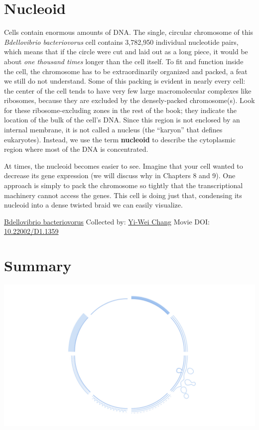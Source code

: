 \documentclass[]{tufte-book}
\begin{document}
\hypertarget{nucleoid}{%
\section{Nucleoid}\label{nucleoid}}

Cells contain enormous amounts of DNA. The single, circular chromosome of this \emph{Bdellovibrio bacteriovorus} cell contains 3,782,950 individual nucleotide pairs, which means that if the circle were cut and laid out as a long piece, it would be about \emph{one thousand times} longer than the cell itself. To fit and function inside the cell, the chromosome has to be extraordinarily organized and packed, a feat we still do not understand. Some of this packing is evident in nearly every cell: the center of the cell tends to have very few large macromolecular complexes like ribosomes, because they are excluded by the densely-packed chromosome(s). Look for these ribosome-excluding zones in the rest of the book; they indicate the location of the bulk of the cell's DNA. Since this region is not enclosed by an internal membrane, it is not called a nucleus (the ``karyon'' that defines eukaryotes). Instead, we use the term \textbf{nucleoid} to describe the cytoplasmic region where most of the DNA is concentrated.

At times, the nucleoid becomes easier to see. Imagine that your cell wanted to decrease its gene expression (we will discuss why in Chapters 8 and 9). One approach is simply to pack the chromosome so tightly that the transcriptional machinery cannot access the genes. This cell is doing just that, condensing its nucleoid into a dense twisted braid we can easily visualize.



\hypertarget{htmlwidget-012abbe380afda8eb1aa}{}

\label{fig:2-10}\protect\hyperlink{tree}{Bdellovibrio bacteriovorus} Collected by: \protect\hyperlink{yi-wei_chang}{Yi-Wei Chang} Movie DOI: \href{https://doi.org/10.22002/D1.1359}{10.22002/D1.1359}

\hypertarget{summary-1}{%
\section{Summary}\label{summary-1}}

\includegraphics{img/summaries/02_Envelope}
\end{document}
